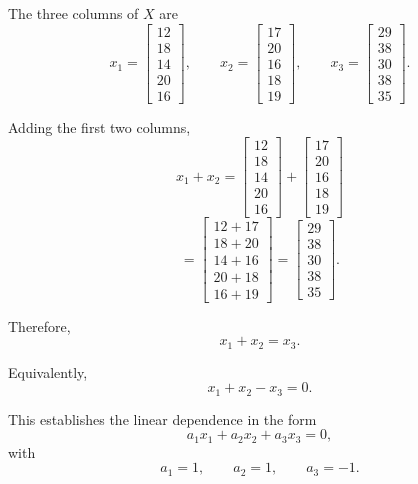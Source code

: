 \documentclass[12pt]{article}
\begin{document}
	The three columns of \(X\) are
	\[
	x_1=
	\begin{bmatrix}
		12\\18\\14\\20\\16
	\end{bmatrix},
	\qquad
	x_2=
	\begin{bmatrix}
		17\\20\\16\\18\\19
	\end{bmatrix},
	\qquad
	x_3=
	\begin{bmatrix}
		29\\38\\30\\38\\35
	\end{bmatrix}.
	\]
	
	Adding the first two columns,
	\[
	x_1+x_2
	=
	\begin{bmatrix}
		12\\18\\14\\20\\16
	\end{bmatrix}
	+
	\begin{bmatrix}
		17\\20\\16\\18\\19
	\end{bmatrix}
	\]
	\[
	=
	\begin{bmatrix}
		12+17\\
		18+20\\
		14+16\\
		20+18\\
		16+19
	\end{bmatrix}
	=
	\begin{bmatrix}
		29\\38\\30\\38\\35
	\end{bmatrix}.
	\]
	
	Therefore,
	\[
	\boxed{x_1+x_2=x_3}.
	\]
	
	Equivalently,
	\[
	x_1+x_2-x_3=0.
	\]
	
	This establishes the linear dependence in the form
	\[
	a_1x_1+a_2x_2+a_3x_3=0,
	\]
	with
	\[
	\boxed{
		a_1=1,\qquad
		a_2=1,\qquad
		a_3=-1}.
	\]
	
\end{document}
